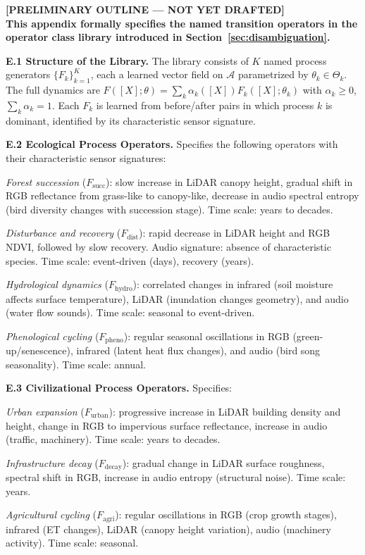 \documentclass[12pt, oneside]{article}
\newcommand{\preliminary}[1]{%
  \colorbox{yellow!20}{\parbox{\dimexpr\linewidth-2\fboxsep}{%
    \textbf{\textcolor{red!70!black}{[PRELIMINARY OUTLINE --- NOT YET DRAFTED]}}\\[4pt]
    #1
  }}%
}
\begin{document}
\preliminary{
\textbf{This appendix formally specifies the named transition operators in the operator
class library introduced in Section~\ref{sec:disambiguation}.}

\medskip
\textbf{E.1 Structure of the Library.}
The library consists of $K$ named process generators $\{F_k\}_{k=1}^K$, each a learned
vector field on $\mathcal{A}$ parametrized by $\theta_k \in \Theta_k$. The full dynamics
are $F([X];\theta) = \sum_k \alpha_k([X]) F_k([X];\theta_k)$ with
$\alpha_k \ge 0$, $\sum_k \alpha_k = 1$. Each $F_k$ is learned from before/after pairs
in which process $k$ is dominant, identified by its characteristic sensor signature.

\medskip
\textbf{E.2 Ecological Process Operators.}
Specifies the following operators with their characteristic sensor signatures:

\textit{Forest succession} ($F_{\mathrm{succ}}$): slow increase in LiDAR canopy height,
gradual shift in RGB reflectance from grass-like to canopy-like, decrease in audio
spectral entropy (bird diversity changes with succession stage). Time scale: years to
decades.

\textit{Disturbance and recovery} ($F_{\mathrm{dist}}$): rapid decrease in LiDAR height
and RGB NDVI, followed by slow recovery. Audio signature: absence of characteristic
species. Time scale: event-driven (days), recovery (years).

\textit{Hydrological dynamics} ($F_{\mathrm{hydro}}$): correlated changes in infrared
(soil moisture affects surface temperature), LiDAR (inundation changes geometry), and
audio (water flow sounds). Time scale: seasonal to event-driven.

\textit{Phenological cycling} ($F_{\mathrm{pheno}}$): regular seasonal oscillations in
RGB (green-up/senescence), infrared (latent heat flux changes), and audio (bird song
seasonality). Time scale: annual.

\medskip
\textbf{E.3 Civilizational Process Operators.}
Specifies:

\textit{Urban expansion} ($F_{\mathrm{urban}}$): progressive increase in LiDAR building
density and height, change in RGB to impervious surface reflectance, increase in audio
(traffic, machinery). Time scale: years to decades.

\textit{Infrastructure decay} ($F_{\mathrm{decay}}$): gradual change in LiDAR surface
roughness, spectral shift in RGB, increase in audio entropy (structural noise). Time
scale: years.

\textit{Agricultural cycling} ($F_{\mathrm{agri}}$): regular oscillations in RGB
(crop growth stages), infrared (ET changes), LiDAR (canopy height variation), audio
(machinery activity). Time scale: seasonal.

}
\end{document}
